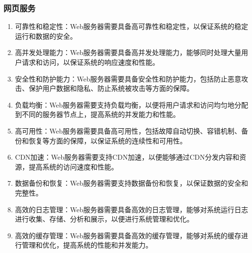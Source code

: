 \documentclass[UTF8]{ctexart}
\begin{document}
    \subsubsection{网页服务}
    \begin{enumerate}
        \item 可靠性和稳定性：Web服务器需要具备高可靠性和稳定性，以保证系统的稳定运行和数据的安全。
        \item 高并发处理能力：Web服务器需要具备高并发处理能力，能够同时处理大量用户请求和访问，以保证系统的响应速度和性能。
        \item 安全性和防护能力：Web服务器需要具备安全性和防护能力，包括防止恶意攻击、保护用户数据和隐私、防止系统被攻击等方面的保障。
        \item 负载均衡：Web服务器需要支持负载均衡，以便将用户请求和访问均匀地分配到不同的服务器节点上，提高系统的并发能力和性能。
        \item 高可用性：Web服务器需要具备高可用性，包括故障自动切换、容错机制、备份和恢复等方面的保障，以保证系统的连续性和可用性。
        \item CDN加速：Web服务器需要支持CDN加速，以便能够通过CDN分发内容和资源，提高系统的访问速度和性能。
        \item 数据备份和恢复：Web服务器需要支持数据备份和恢复，以保证数据的安全和完整性。
        \item 高效的日志管理：Web服务器需要具备高效的日志管理，能够对系统运行日志进行收集、存储、分析和展示，以便进行系统管理和优化。
        \item 高效的缓存管理：Web服务器需要具备高效的缓存管理，能够对系统的缓存进行管理和优化，提高系统的性能和并发能力。
    \end{enumerate}
\end{document}
